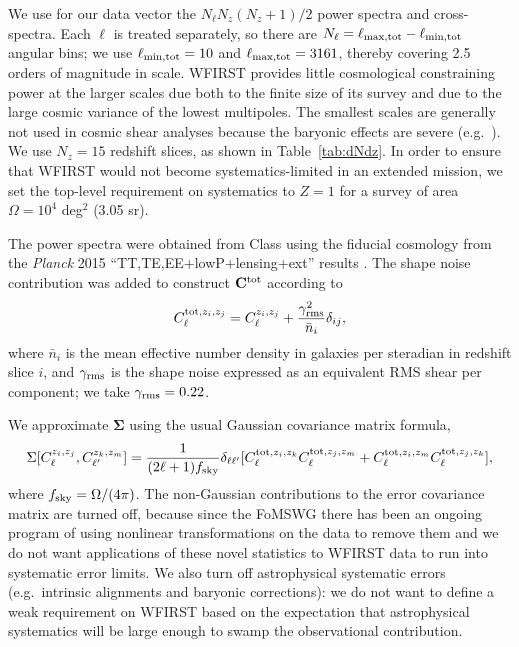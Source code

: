 We use for our data vector the $N_\ell N_z(N_z+1)/2$ power spectra and cross-spectra. Each $\ell$ is treated separately, so there are $N_\ell=\ell_{\rm max,tot}-\ell_{\rm min,tot}$ angular bins; we use $\ell_{\rm min,tot}=10$ and $\ell_{\rm max,tot}=3161$, thereby covering 2.5 orders of magnitude in scale. WFIRST provides little cosmological constraining power at the larger scales due both to the finite size of its survey and due to the large cosmic variance of the lowest multipoles. The smallest scales are generally not used in cosmic shear analyses because the baryonic effects are severe (e.g.\ \citealt{2008PhRvD..77d3507Z, 2013PhRvD..87d3509Z}). We use $N_z=15$ redshift slices, as shown in Table~\ref{tab:dNdz}. In order to ensure that WFIRST would not become systematics-limited in an extended mission, we set the top-level requirement on systematics to $Z=1$ for a survey of area $\Omega =10^4$ deg$^2$ (3.05 sr).


The power spectra were obtained from {\sc Class} \citep{2011JCAP...07..034B} using the fiducial cosmology from the {\slshape Planck} 2015 ``TT,TE,EE+lowP+lensing+ext'' results \citep{2015arXiv150201589P}. The shape noise contribution was added to construct ${\bf C}^{\rm tot}$ according to
\begin{equation}
C^{{\rm tot},z_i,z_j}_\ell = C^{z_i,z_j}_\ell + \frac{\gamma_{\rm rms}^2}{\bar n_i}\delta_{ij},
\end{equation}
where $\bar n_i$ is the mean effective number density in galaxies per steradian in redshift slice $i$, and $\gamma_{\rm rms}$ is the shape noise expressed as an equivalent RMS shear per component; we take $\gamma_{\rm rms} = 0.22$.

We approximate ${\boldsymbol\Sigma}$ using the usual Gaussian covariance matrix formula,
\begin{equation}
\Sigma[C^{z_i,z_j}_\ell, C^{z_k,z_m}_{\ell'}] = \frac{1}{(2\ell+1)f_{\rm sky}} \delta_{\ell\ell'} [ C^{{\rm tot},z_i,z_k}_\ell C^{{\rm tot},z_j,z_m}_\ell + C^{{\rm tot},z_i,z_m}_\ell C^{{\rm tot},z_j,z_k}_\ell],
\label{eq:SGauss}
\end{equation}
where $f_{\rm sky} = \Omega/(4\pi)$.
The non-Gaussian contributions to the error covariance matrix are turned off, because since the FoMSWG \citep{2009arXiv0901.0721A} there has been an ongoing program of using nonlinear transformations on the data to remove them \citep[e.g.][]{2009ApJ...698L..90N, 2011ApJ...729L..11S} and we do not want applications of these novel statistics to WFIRST data to run into systematic error limits. We also turn off astrophysical systematic errors (e.g.\ intrinsic alignments and baryonic corrections): we do not want to define a weak requirement on WFIRST based on the expectation that astrophysical systematics will be large enough to swamp the observational contribution.

